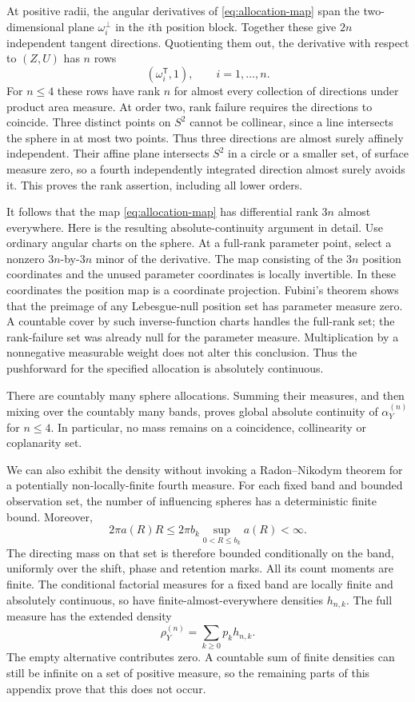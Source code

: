 \documentclass[11pt,a4paper]{article}
\numberwithin{equation}{section}
\theoremstyle{definition}
\theoremstyle{remark}
\begin{document}
At positive radii, the angular derivatives of
\eqref{eq:allocation-map} span the two-dimensional plane
$\omega_i^\perp$ in the $i$th position block. Together these give $2n$
independent tangent directions. Quotienting them out, the derivative with
respect to $(Z,U)$ has $n$ rows
\begin{equation}
 (\omega_i^{\mathsf T},1),\qquad i=1,\ldots,n.
 \label{eq:normal-rows}
\end{equation}
For $n\leq4$ these rows have rank $n$ for almost every collection of
directions under product area measure. At order two, rank failure
requires the directions to coincide. Three distinct points on $S^2$
cannot be collinear, since a line intersects the sphere in at most two
points. Thus three directions are almost surely affinely independent.
Their affine plane intersects $S^2$ in a circle or a smaller set, of
surface measure zero, so a fourth independently integrated direction
almost surely avoids it. This proves the rank assertion, including all
lower orders.

It follows that the map \eqref{eq:allocation-map} has differential rank
$3n$ almost everywhere. Here is the resulting absolute-continuity argument
in detail. Use ordinary angular charts on the sphere. At a full-rank
parameter point, select a nonzero $3n$-by-$3n$ minor of the derivative.
The map consisting of the $3n$ position coordinates and the unused
parameter coordinates is locally invertible. In these coordinates the
position map is a coordinate projection. Fubini's theorem shows that the
preimage of any Lebesgue-null position set has parameter measure zero.
A countable cover by such inverse-function charts handles the full-rank
set; the rank-failure set was already null for the parameter measure.
Multiplication by a nonnegative measurable weight does not alter this
conclusion. Thus the pushforward for the specified allocation is
absolutely continuous.

There are countably many sphere allocations. Summing their measures, and
then mixing over the countably many bands, proves global absolute
continuity of $\alpha_Y^{(n)}$ for $n\leq4$. In particular, no mass remains
on a coincidence, collinearity or coplanarity set.

We can also exhibit the density without invoking a Radon--Nikodym theorem
for a potentially non-locally-finite fourth measure. For each fixed band
and bounded observation set, the number of influencing spheres has a
deterministic finite bound. Moreover,
\[
 2\pi a(R)R\leq2\pi b_k\sup_{0<R\leq b_k}a(R)<\infty.
\]
The directing mass on that set is therefore bounded conditionally on the
band, uniformly over the shift, phase and retention marks. All its count
moments are finite. The conditional factorial measures for a fixed band
are locally finite and absolutely continuous, so have finite-almost-everywhere
densities $h_{n,k}$. The full measure has the extended density
\begin{equation}
 \rho_Y^{(n)}=\sum_{k\geq0}p_kh_{n,k}.
 \label{eq:band-density-sum}
\end{equation}
The empty alternative contributes zero. A countable sum of finite densities
can still be infinite on a set of positive measure, so the remaining
parts of this appendix prove that this does not occur.
\end{document}
